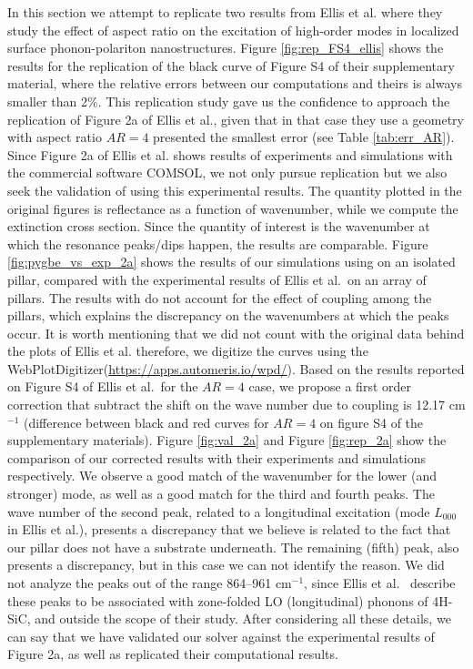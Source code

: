 In this section we attempt to replicate two results from Ellis et al. \cite{ellis2016} where they study the effect of aspect ratio on the 
excitation of high-order modes in localized surface phonon-polariton nanostructures. Figure \ref{fig:rep_FS4_ellis} shows the results for
the replication of the black curve of Figure S4 of their supplementary material, where the relative errors between our computations and 
theirs is always smaller than 2$\%$. This replication study gave us the confidence to approach the replication of Figure 2a of Ellis et al., 
given that in that case they use a geometry with aspect ratio $AR=4$ presented the smallest error (see Table \ref{tab:err_AR}). Since 
Figure 2a of Ellis et al. shows results of experiments and simulations with the commercial software COMSOL, we not only pursue replication 
but we also seek the validation of \pygbe using this experimental results. The quantity plotted in the original figures is reflectance as a 
function of wavenumber, while we compute the extinction cross section. Since the quantity of interest is the wavenumber at which the resonance 
peaks/dips happen, the results are comparable. 
Figure \ref{fig:pygbe_vs_exp_2a} shows the results of our simulations using \pygbe on an isolated pillar, compared with the experimental results
of Ellis et al.\ on an array of pillars. The results with \pygbe do not account for the effect of coupling among the pillars, which explains the  
discrepancy on the wavenumbers at which the peaks occur. It is worth mentioning that we did not count with the original data behind the plots of 
Ellis et al. therefore, we digitize the curves using the WebPlotDigitizer(\url{https://apps.automeris.io/wpd/}). Based on the results reported 
on Figure S4 of Ellis et al.\ for the $AR=4$ case, we propose a first order correction that subtract the shift on the wave number due to
coupling is 12.17 cm$^{-1}$ (difference between black and red curves for $AR=4$ on figure S4 of the supplementary materials). Figure \ref{fig:val_2a}
and Figure \ref{fig:rep_2a} show the comparison of our corrected results with their experiments and simulations respectively. We observe a good match 
of the wavenumber for the lower (and stronger) mode, as well as a good match for the  third and fourth peaks. The wave number of the second peak, related 
to a longitudinal excitation (mode $L_{000}$ in Ellis et al.), presents a discrepancy that we believe is related to the fact that our 
pillar does not have a substrate underneath. The remaining (fifth) peak, also presents a discrepancy, but in this case we can not identify the reason.
We did not analyze the peaks out of the range 864--961 cm$^{-1}$, since Ellis et al. \ describe these peaks to be associated with 
zone-folded LO (longitudinal) phonons of 4H-SiC, and outside the scope of their study.
After considering all these details, we can say that we have validated our solver \pygbe against the experimental results of 
Figure 2a, as well as replicated their computational results.

